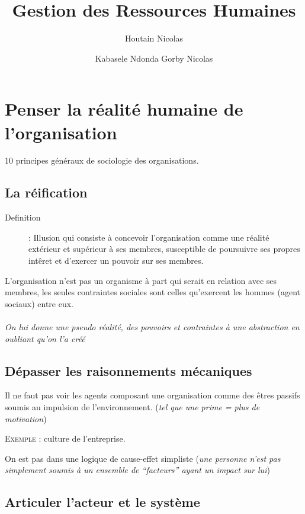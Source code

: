 \documentclass[11pt]{article} %
\title{Gestion des Ressources Humaines}
\author{Houtain Nicolas \and Kabasele Ndonda Gorby Nicolas}
\begin{document}
\maketitle
\tableofcontents


\section{Penser la réalité humaine de l'organisation}

10 principes généraux de sociologie des organisations.

\subsection{La réification}
\begin{description}
    \item[Definition]   :    Illusion   qui   consiste    à   concevoir
l'organisation  comme  une réalité  extérieur  et  supérieur à  ses
membres, susceptible de  poursuivre ses propres intêret  et d'exercer un
pouvoir sur ses membres.
\end{description}

L'organisation n'est  pas un  organisme à part  qui serait  en relation
avec  ses   membres,  les   seules  contraintes  sociales   sont  celles
qu'exercent les hommes (agent sociaux) entre eux.

\paragraph{ } \textit{On lui donne une pseudo réalité, des pouvoirs et
contraintes à une abstraction en oubliant qu'on l'a créé}


\subsection{Dépasser les raisonnements mécaniques} Il ne faut pas voir
les agents composant une organisation comme des êtres passifs soumis au
impulsion  de l'environnement.  (\textit{tel  que une  prime  = plus  de
motivation})

\textsc{Exemple} : culture de l'entreprise.

On est pas dans une logique de cause-effet simpliste (\textit{une
personne n'est pas simplement soumis à un ensemble de ``facteurs''
ayant un impact sur lui})


\subsection{Articuler l'acteur et le système}
\end{document}
